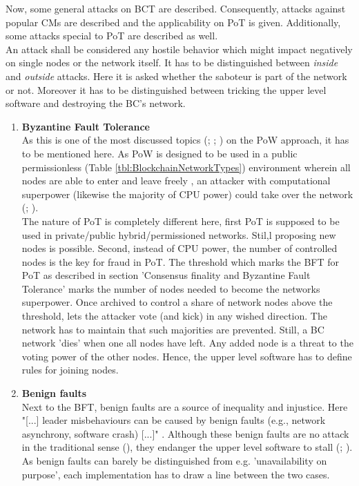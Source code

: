 Now, some general attacks on \gls{BCT} are described.
Consequently, attacks against popular \gls{CM}s are described and the applicability on \gls{PoT} is given.
Additionally, some attacks special to \gls{PoT} are described as well. \\
An attack shall be considered any hostile behavior which might impact negatively on single nodes or the network itself.
It has to be distinguished between \textit{inside} and \textit{outside} attacks.
Here it is asked whether the saboteur is part of the network or not.
Moreover it has to be distinguished between tricking the upper level software and destroying the \gls{BC}'s network.
\bigbreak
\begin{enumerate}	
	\item \textbf{Byzantine Fault Tolerance} \\
	As this is one of the most discussed topics (\cite{Dib.2018}; \cite{Khan.2020}; \cite{Gramoli.2017})
	on the \gls{PoW} approach, it has to be mentioned here.
	As \gls{PoW} is designed to be used in a public permissionless (Table \ref{tbl:BlockchainNetworkTypes}) environment 
	wherein all nodes are able to enter and leave freely \cite[8]{Nakamoto.2009},
	an attacker with computational superpower (likewise the majority of CPU power)
	could take over the network (\citet[8]{Nakamoto.2009}; \citet[4]{Demi.2021}). \\	
	The nature of \gls{PoT} is completely different here, first \gls{PoT} is supposed to be used in private/public hybrid/permissioned networks.
	Stil,l proposing new nodes is possible.
	Second, instead of CPU power, the number of controlled nodes is the key for fraud in \gls{PoT}.
	The threshold which marks the \gls{BFT} for \gls{PoT} as described in section 'Consensus finality and Byzantine Fault Tolerance' marks the number of nodes needed to become the networks superpower.
	Once archived to control a share of network nodes above the threshold, lets the attacker vote (and kick) in any wished direction.
	The network has to maintain that such majorities are prevented.
	Still, a \gls{BC} network 'dies' when one all nodes have left.
	Any added node is a threat to the voting power of the other nodes.
	Hence, the upper level software has to define rules for joining nodes.
	
	\item \textbf{Benign faults} \\
	Next to the \gls{BFT}, benign faults are a source of inequality and injustice.
	Here "[...] leader misbehaviours can be caused by benign faults (e.g., network asynchrony, software crash) [...]" \cite[4]{Angelis.2018}.
	Although these benign faults are no attack in the traditional sense (\citet{CharronBost.2009}), they endanger the upper level software to stall (\citet[8]{Angelis.2018}; \citet[7]{Greenspan.2015}).
	As benign faults can barely be distinguished from e.g. 'unavailability on purpose', each implementation has to draw a line between the two cases.
	

\end{enumerate}
